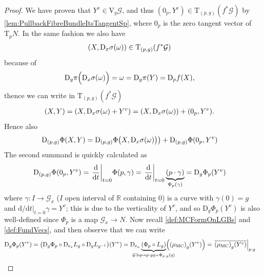 \documentclass[reqno,a4paper,oneside]{amsart}
\newcommand\MC{\mu_{{\rm MC}}}
\theoremstyle{plain}
\theoremstyle{remark}
\theoremstyle{definition}
\begin{document}
\begin{proof}
We have proven that $Y^v \in \mathrm{V}_g\mathcal{G}$, and thus $(0_p, Y^v) \in \mathrm{T}_{(p, g)}(f^*\mathcal{G})$ by \ref{lem:PullbackFibreBundleItsTangentSp}, where $0_p$ is the zero tangent vector of $\mathrm{T}_pN$. In the same fashion we also have
\begin{align*}
\mleft(X,  \mathrm{D}_x \sigma (\omega) \mright)
&\in \mathrm{T}_{(p, g)}(f^*\mathcal{G})
\end{align*}
because of
\begin{align*}
\mathrm{D}_g\pi \Bigl( \mathrm{D}_x \sigma (\omega)  \Bigr)
&=
\omega
=
\mathrm{D}_g \pi (Y)
=
\mathrm{D}_p f (X),
\end{align*}
thence we can write in $\mathrm{T}_{(p, g)}(f^*\mathcal{G})$
\begin{align*}
(X, Y)
&=
\mleft(X, \mathrm{D}_x \sigma (\omega) + Y^v \mright)
=
\mleft(X, \mathrm{D}_x \sigma (\omega) \mright)
	+ (0_p, Y^v).
\end{align*}
Hence also
\begin{align}\label{DifferentialOfActionSplitFirst}
\mathrm{D}_{(p, g)}\Phi(X, Y)
&=
\mathrm{D}_{(p, g)}\Phi\mleft(X, \mathrm{D}_x \sigma (\omega) \bigr) \mright)
	+ \mathrm{D}_{(p, g)}\Phi(0_p, Y^v)
\end{align}
The second summand is quickly calculated as
\begin{align*}
\mathrm{D}_{(p, g)}\Phi(0_p, Y^v)
&=
\mleft.\frac{\mathrm{d}}{\mathrm{d}t}\mright|_{t=0} \Phi(p, \gamma)
=
\mleft.\frac{\mathrm{d}}{\mathrm{d}t}\mright|_{t=0} \underbrace{(p \cdot \gamma)}
	_{\Phi_p(\gamma)}
=
\mathrm{D}_{g}\Phi_p (Y^v)
\end{align*}
where $\gamma: I \to \mathcal{G}_x$ ($I$ open interval of $\mathbb{R}$ containing 0) is a curve with $\gamma(0) = g$ and $\mathrm{d}/\mathrm{d}t|_{t=0} \gamma = Y^v$; this is due to the verticality of $Y^v$, and so $\mathrm{D}_g\Phi_p(Y^v)$ is also well-defined since $\Phi_p$ is a map $\mathcal{G}_x \to N$. Now recall \ref{def:MCFormOnLGBs} and \ref{def:FundVecs}, and then observe that we can write
\begin{align}\label{ClassicalWayToWriteLeibnizRuleWithLeftPushForwardInsteadOfMCForm}
\mathrm{D}_{g}\Phi_p (Y^v)
&=
\mleft(\mathrm{D}_{g}\Phi_p \circ \mathrm{D}_{e_x}L_g \circ \mathrm{D}_g L_{g^{-1}} \mright)(Y^v)
=
\mathrm{D}_{e_x}\underbrace{\mleft( \Phi_p \circ L_g \mright)}
	_{\mathclap{ \mathcal{G} \ni q \mapsto p \cdot gq = \Phi_{p \cdot g}(q) }}
	\mleft(\mleft( \MC\mright)_g (Y^v) \mright)
=
\mleft.{\overline{\mleft( \MC \mright)_g (Y^v)}}\mright|_{p \cdot g}

\end{align}
\end{proof}
\end{document}
